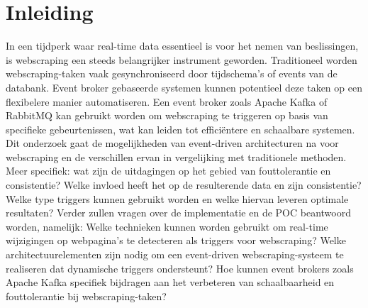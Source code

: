 


% 

\section{Inleiding}%
\label{sec:inleiding}

In een tijdperk waar real-time data essentieel is voor het nemen van beslissingen, is webscraping een steeds belangrijker instrument geworden. Traditioneel worden webscraping-taken vaak gesynchroniseerd door tijdschema's of events van de databank. Event broker gebaseerde systemen kunnen potentieel deze taken op een flexibelere manier automatiseren. Een event broker zoals Apache Kafka of RabbitMQ kan gebruikt worden om webscraping te triggeren op basis van specifieke gebeurtenissen, wat kan leiden tot efficiëntere en schaalbare systemen. Dit onderzoek gaat de mogelijkheden van event-driven architecturen na voor webscraping en de verschillen ervan in vergelijking met traditionele methoden. Meer specifiek: wat zijn de uitdagingen op het gebied van fouttolerantie en consistentie? Welke invloed heeft het op de resulterende data en zijn consistentie? Welke type triggers kunnen gebruikt worden en welke hiervan leveren optimale resultaten? Verder zullen vragen over de implementatie en de POC beantwoord worden, namelijk: Welke technieken kunnen worden gebruikt om real-time wijzigingen op webpagina's te detecteren als triggers voor webscraping? Welke architectuurelementen zijn nodig om een event-driven webscraping-systeem te realiseren dat dynamische triggers ondersteunt? Hoe kunnen event brokers zoals Apache Kafka specifiek bijdragen aan het verbeteren van schaalbaarheid en fouttolerantie bij webscraping-taken?



